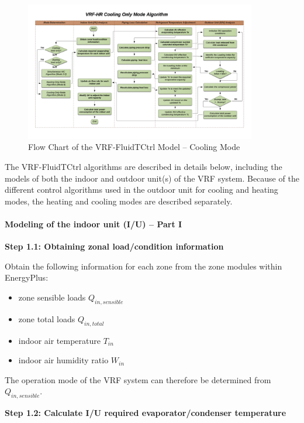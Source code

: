 \begin{figure}[hbtp] %
\centering
\includegraphics[width=0.9\textwidth, height=0.9\textheight, keepaspectratio=true]{media/VRF-FluidTCtrl-3b.png}
\caption{Flow Chart of the VRF-FluidTCtrl Model -- Cooling Mode \label{fig:vrf-fluid-t-ctrl-3b}}
\end{figure}

The VRF-FluidTCtrl algorithms are described in details below, including the models of both the indoor and outdoor unit(s) of the VRF system. Because of the different control algorithms used in the outdoor unit for cooling and heating modes, the heating and cooling modes are described separately.

\paragraph{Modeling of the indoor unit (I/U) -- Part I}\label{modeling-of-the-indoor-unit-iu-part-i}

\textbf{Step 1.1: Obtaining zonal load/condition information}

Obtain the following information for each zone from the zone modules within EnergyPlus:

\begin{itemize}
  \item
    zone sensible loads $Q_{in, sensible}$
  \item
    zone total loads $Q_{in, total}$
  \item
    indoor air temperature $T_{in}$
  \item
    indoor air humidity ratio $W_{in}$
\end{itemize}

The operation mode of the VRF system can therefore be determined from $Q_{in, sensible}$.

\textbf{Step 1.2: Calculate I/U required evaporator/condenser temperature}

